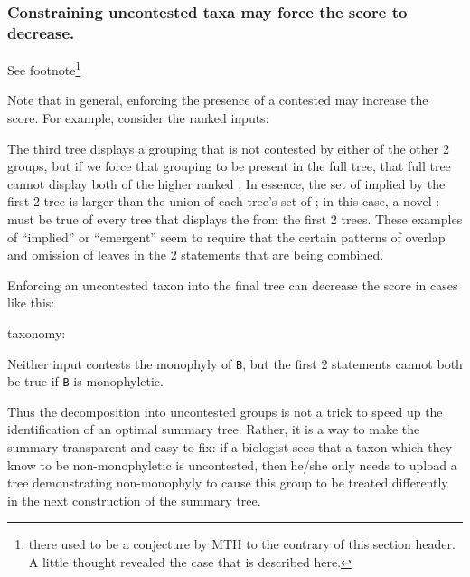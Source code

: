 \documentclass[11pt]{article}
\begin{document}
\subsubsection{Constraining uncontested taxa may force the \SWIPSD score to decrease.}
See footnote\footnote{there used to be a conjecture by MTH to the contrary of this section header.
A little thought revealed the case that is described here.}

Note that in general, enforcing the presence of a contested \pss may increase the 
    \SWIPSD score.
For example, consider the ranked inputs:
\begin{compactenum}
\item {}
\item {}
\item {}
\end{compactenum}
The third tree displays a grouping that is not contested by either of the other 2 groups, but
    if we force that grouping to be present in the full tree, that full tree cannot 
    display both of the higher ranked \pss.
In essence, the set of \pss implied by the first 2 tree is larger than the union of each tree's set
    of \pss; in this case, a novel \pss:  must be true of every 
    tree that displays the \pss from the first 2 trees.
These examples of ``implied'' or ``emergent'' \pss seem to require that the certain
    patterns of overlap and omission of leaves in the 2 statements that are being combined.

Enforcing an uncontested taxon into the final tree can decrease the score in cases like this:
\begin{compactenum}
\item {}
\item {}
\item taxonomy: 
\end{compactenum}
Neither input contests the monophyly of \texttt{B}, but the first 2 statements cannot 
    both be true if \texttt{B} is monophyletic.

Thus the decomposition into uncontested groups is not a trick to speed up
    the identification of an optimal summary tree.
Rather, it is a way to make the summary transparent and easy to fix:
    if a biologist sees that a taxon which they know to be non-monophyletic
    is uncontested, then he/she only needs to upload a tree demonstrating
    non-monophyly to cause this group to be treated differently in the next 
    construction of the summary tree.
\end{document}
